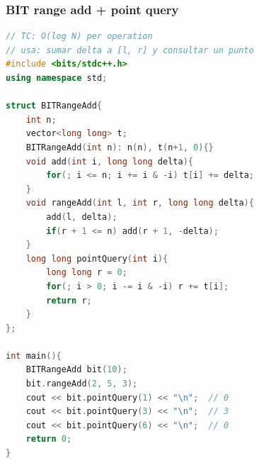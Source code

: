 \subsubsection{BIT range add + point query}
\begin{lstlisting}[style=mystyle, language=C++]
// TC: O(log N) per operation
// usa: sumar delta a [l, r] y consultar un punto
#include <bits/stdc++.h>
using namespace std;

struct BITRangeAdd{
	int n;
	vector<long long> t;
	BITRangeAdd(int n): n(n), t(n+1, 0){}
	void add(int i, long long delta){
		for(; i <= n; i += i & -i) t[i] += delta;
	}
	void rangeAdd(int l, int r, long long delta){
		add(l, delta);
		if(r + 1 <= n) add(r + 1, -delta);
	}
	long long pointQuery(int i){
		long long r = 0;
		for(; i > 0; i -= i & -i) r += t[i];
		return r;
	}
};

int main(){
	BITRangeAdd bit(10);
	bit.rangeAdd(2, 5, 3);
	cout << bit.pointQuery(1) << "\n";  // 0
	cout << bit.pointQuery(3) << "\n";  // 3
	cout << bit.pointQuery(6) << "\n";  // 0
	return 0;
}
\end{lstlisting}
